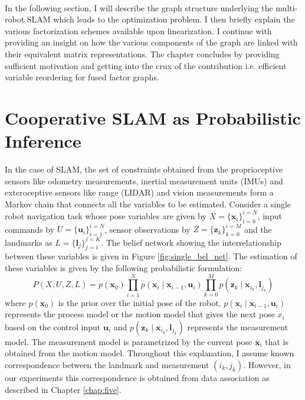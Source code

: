 \paragraph{}
In the following section, I will describe the graph structure underlying the multi-robot SLAM which leads to the optimization problem. I then briefly explain the various factorization schemes available upon linearization. I continue with providing an insight on how the various components of the graph are linked with their equivalent matrix representations. The chapter concludes by providing sufficient motivation and getting into the crux of the contribution i.e. efficient variable reordering for fused factor graphs. 

\section{Cooperative SLAM as Probabilistic Inference}
In the case of SLAM, the set of constraints obtained from the proprioceptive sensors like odometry measurements, inertial measurement units (IMUs) and exteroceptive sensors like range (LIDAR) and vision measurements form a Markov chain that connects all the variables to be estimated. Consider a single robot navigation task whose pose variables are given by $X = \{\textbf{x}_i\}_{i=0}^{i=N}$, input commands by $U = \{\textbf{u}_i\}_{i=1}^{i=N}$, sensor observations by $Z = \{\textbf{z}_k\}_{k=0}^{i=M}$ and the landmarks as $L = \{\textbf{l}_j\}_{j=1}^{j=K}$. The belief network showing the interrelationship between these variables is given in Figure \ref{fig:single_bel_net}. The estimation of these variables is given by the following probabilistic formulation: 
\begin{equation}
P(X,U,Z,L) = p(\textbf{x}_0)\prod_{i=1}^{N}p(\textbf{x}_i\mid \textbf{x}_{i-1}, \textbf{u}_i) \prod_{k=0}^{M}p(\textbf{z}_k\mid \textbf{x}_{i_k}, \textbf{l}_{j_k})
\label{eq:jp}
\end{equation}
where $p(\textbf{x}_0)$ is the prior over the initial pose of the robot, $p(\textbf{x}_i\mid \textbf{x}_{i-1}, \textbf{u}_i)$ represents the process model or the motion model that gives the next pose $x_i$ based on the control input $\textbf{u}_i$ and $p(\textbf{z}_k\mid \textbf{x}_{i_k}, \textbf{l}_{j_k})$ represents the measurement model. The measurement model is parametrized by the current pose $\textbf{x}_i$ that is obtained from the motion model. Throughout this explanation, I assume known correspondence between the landmark and measurement $(i_k, j_k)$. However, in our experiments this correspondence is obtained from data association as described in Chapter \ref{chap:five}. 
